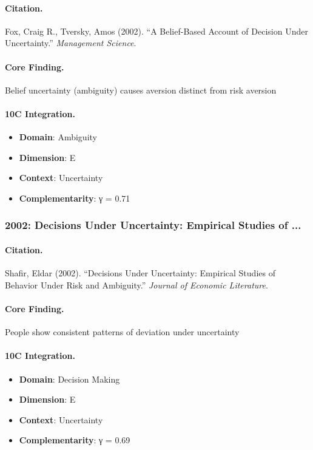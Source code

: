 \paragraph{Citation.}
Fox, Craig R., Tversky, Amos (2002). ``A Belief-Based Account of Decision Under Uncertainty.''
\textit{Management Science}.

\paragraph{Core Finding.}
Belief uncertainty (ambiguity) causes aversion distinct from risk aversion

\paragraph{10C Integration.}
\begin{itemize}[nosep]
  \item \textbf{Domain}: Ambiguity
  \item \textbf{Dimension}: E
  \item \textbf{Context}: Uncertainty
  \item \textbf{Complementarity}: γ = 0.71
\end{itemize}

\subsubsection{2002: Decisions Under Uncertainty: Empirical Studies of ...}

\paragraph{Citation.}
Shafir, Eldar (2002). ``Decisions Under Uncertainty: Empirical Studies of Behavior Under Risk and Ambiguity.''
\textit{Journal of Economic Literature}.

\paragraph{Core Finding.}
People show consistent patterns of deviation under uncertainty

\paragraph{10C Integration.}
\begin{itemize}[nosep]
  \item \textbf{Domain}: Decision Making
  \item \textbf{Dimension}: E
  \item \textbf{Context}: Uncertainty
  \item \textbf{Complementarity}: γ = 0.69
\end{itemize}

